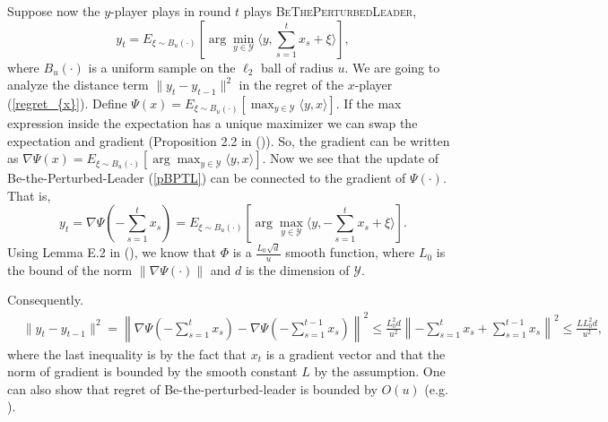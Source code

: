 \documentclass[pmlr]{jmlr} %
\def\BTPL{\textsc{BeThePerturbedLeader}\xspace}
\newcommand{\norm}[1]{\left\lVert#1\right\rVert}
\newcommand{\YY}{\mathcal{Y}}
\newcommand{\pr}[1]{\left(#1\right)}
\begin{document}
Suppose now the $y$-player plays in round $t$ plays \BTPL,
\begin{equation} \label{pBPTL}
y_{t} = E_{\xi \sim B_u(\cdot)}[ \arg\min_{y\in \YY} \langle y, \sum_{s=1}^{t} x_{s} + \xi \rangle],
\end{equation}
where $B_{u}(\cdot)$ is a uniform sample on the $\ell_{2}$ ball of radius $u$.
We are going to analyze the distance term $\| y_{t} - y_{t-1} \|^{2}$
in the regret of the $x$-player (\ref{regret_{x}}).
Define $\Psi(x) = E_{\xi \sim B_u(\cdot)}[ \max_{y \in \YY} \langle y, x \rangle ]$.
If the max expression inside the expectation has a unique maximizer 
we can swap the expectation and gradient (Proposition 2.2 in (\cite{B73})).
So,
the gradient can be written as $\nabla \Psi(x) = E_{\xi \sim B_u(\cdot)}[ \arg\max_{y \in \YY} \langle y, x \rangle ]$.
Now we see that the update of Be-the-Perturbed-Leader (\ref{pBPTL}) can be connected to the gradient of $\Psi(\cdot)$.
That is,
\begin{equation}
y_{t} = \nabla \Psi(- \sum_{s=1}^{t} x_{s}) = E_{\xi \sim B_u(\cdot)}[ \arg\max_{y \in \YY} \langle y, - \sum_{s=1}^{t} x_{s} + \xi \rangle ].
\end{equation}
Using Lemma E.2 in (\cite{DBW12}),
we know that $\Phi$ is a $\frac{ L_{0} \sqrt{d} }{u}$ smooth function, where $L_{0}$ is the bound of the norm $\| \nabla \Psi(\cdot)  \|$ and $d$ is the dimension of $\YY$.

Consequently.
\begin{equation} \label{shrinkP1}
\begin{aligned}
& \| y_{t} - y_{t-1}\|^{2} = \norm{ \nabla \Psi\pr{- \sum_{s=1}^{t} x_{s}} -\nabla \Psi \pr{- \sum_{s=1}^{t-1} x_{s}} }^{2}
\leq \frac{L_{0}^{2} d}{u^{2}} \norm{ - \sum_{s=1}^{t} x_{s} + \sum_{s=1}^{t-1} x_{s} }^{2}
\leq \frac{L L_{0}^{2} d}{u^{2}},
\end{aligned}
\end{equation}
where the last inequality is by the fact that $x_{t}$ is a gradient vector and that the norm of gradient is bounded by the smooth constant $L$ by the assumption.
One can also show that regret of Be-the-perturbed-leader is bounded by $O(u)$ (e.g. \cite{KV05,cesa2006prediction}).  
\end{document}
